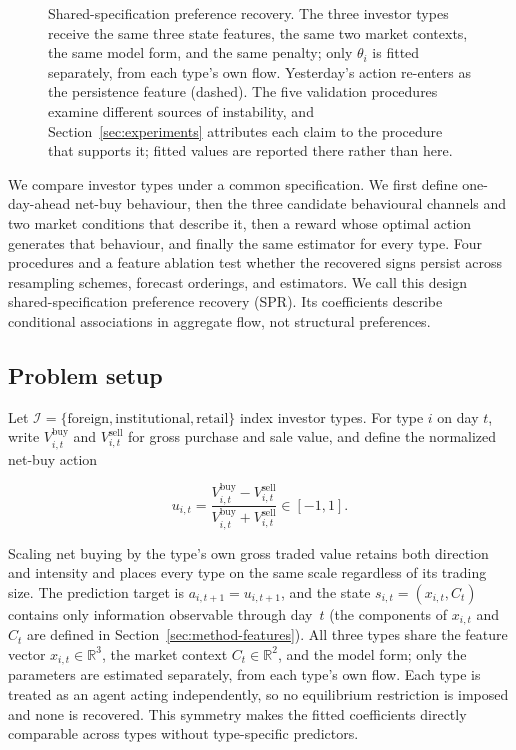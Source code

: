 \documentclass[sigconf,anonymous,review]{acmart}
\begin{document}
\begin{figure}[t]
{\begin{tikzpicture}
\end{tikzpicture}}
\caption{Shared-specification preference recovery. The three investor
types receive the same three state features, the same two market
contexts, the same model form, and the same penalty; only $\theta_i$ is
fitted separately, from each type's own flow. Yesterday's action re-enters
as the persistence feature (dashed). The five validation procedures
examine different sources of instability, and
Section~\ref{sec:experiments} attributes each claim to the procedure that
supports it; fitted values are reported there rather than here.}
\label{fig:pipeline}
\end{figure}


We compare investor types under a common specification. We first define
one-day-ahead net-buy behaviour, then the three candidate behavioural
channels and two market conditions that describe it, then a reward whose
optimal action generates that behaviour, and finally the same estimator
for every type. Four procedures and a feature ablation test whether the
recovered signs persist across resampling schemes, forecast orderings,
and estimators. We call this design shared-specification preference
recovery (SPR). Its coefficients describe conditional associations in
aggregate flow, not structural preferences.

\subsection{Problem setup}
\label{sec:method-setup}

Let $\mathcal{I} = \{\textrm{foreign}, \textrm{institutional},
\textrm{retail}\}$ index investor types. For type $i$ on day $t$, write
$V^{\mathrm{buy}}_{i,t}$ and $V^{\mathrm{sell}}_{i,t}$ for gross purchase
and sale value, and define the normalized net-buy action

\begin{equation}
  \label{eq:action}
  u_{i,t} = \frac{V^{\mathrm{buy}}_{i,t} - V^{\mathrm{sell}}_{i,t}}
                 {V^{\mathrm{buy}}_{i,t} + V^{\mathrm{sell}}_{i,t}}
          \in [-1, 1].
\end{equation}

Scaling net buying by the type's own gross traded value retains both
direction and intensity and places every type on the same scale
regardless of its trading size. The prediction target is
$a_{i,t+1} = u_{i,t+1}$, and the state $s_{i,t} = (x_{i,t}, C_t)$
contains only information observable through day~$t$ (the components of
$x_{i,t}$ and $C_t$ are defined in Section~\ref{sec:method-features}). All three types
share the feature vector $x_{i,t} \in \mathbb{R}^3$, the market context
$C_t \in \mathbb{R}^2$, and the model form; only the parameters are
estimated separately, from each type's own flow. Each type is treated as
an agent acting independently, so no equilibrium restriction is imposed
and none is recovered. This symmetry makes the fitted coefficients
directly comparable across types without type-specific predictors.
\end{document}

